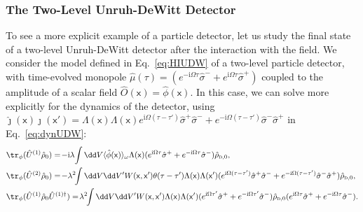 \documentclass[letterpaper,12pt,titlepage,oneside,final]{book}
\newcommand{\mf}{\mathsf}%
\newcommand{\ii}{\mathrm{i}}
\renewcommand{\r}{\hat{\rho}}
\newcommand{\s}{\hat{\sigma}}
\newcommand{\tc}[1]{\textsc{#1}}
\begin{document}

\subsubsection*{The Two-Level Unruh-DeWitt Detector}

To see a more explicit example of a particle detector, let us study the final state of a two-level Unruh-DeWitt detector after the interaction with the field. We consider the model defined in Eq.~\eqref{eq:HIUDW} of a two-level particle detector, with time-evolved monopole $\hat{\mu}(\tau) = (e^{- \ii \Omega \tau}\s^- + e^{\ii \Omega \tau}\s^+)$ coupled to the amplitude of a scalar field $\hat{O}(\mf x) = \hat{\phi}(\mf x)$. In this case, we can solve more explicitly for the dynamics of the detector, using $\hat{\jmath}(\mf x) \hat{\jmath}(\mf x') = \Lambda(\mf x)\Lambda(\mf x)e^{\ii \Omega(\tau - \tau')}\s^+\s^- + e^{-\ii \Omega (\tau - \tau')}\s^-\s^+$ in Eq.~\eqref{eq:dynUDW}:
\begin{align}\label{eq:UDWintermediate}
    &\tr_\phi(\hat{U}^{(1)} \r_0) =  \!-\ii \lambda\! \int \dd V \langle\hat{\phi}(\mf x)\rangle_\omega \Lambda(\mf x)(e^{\ii \Omega \tau} \s^+ + e^{- \ii \Omega \tau}\s^- )\r_{\tc{d},0},\\
    &\tr_\phi(\hat{U}^{(2)} \r_0) =  \!-\lambda^2 \!\!\int \dd V \dd V'W(\mf x, \mf x')\theta(\tau-\tau')\Lambda(\mf x) \Lambda(\mf x')(e^{\ii \Omega(\tau - \tau')}\s^+\s^- + e^{-\ii \Omega (\tau - \tau')}\s^-\s^+) \r_{\tc{d},0},\nonumber\\
    &\tr_\phi(\hat{U}^{(1)} \r_0\hat{U}^{(1)\dagger})  =  \!\lambda^2 \!\!\int \dd V \dd V' W(\mf x, \mf x') \Lambda(\mf x) \Lambda(\mf x') (e^{\ii \Omega \tau'} \s^+ + e^{- \ii \Omega \tau'}\s^- ) \r_{\tc{d},0}(e^{\ii \Omega \tau} \s^+ + e^{- \ii \Omega \tau}\s^- ).\nonumber
\end{align}
\end{document}

